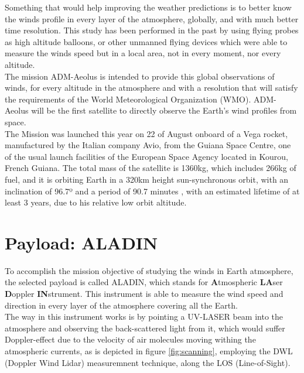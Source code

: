 Something that would help improving the weather predictions is to better know
the winds profile in every layer of the atmosphere, globally, and with much better
time resolution. This study has been performed in the past by using flying probes
as high altitude balloons, or other unmanned flying devices which were able to
measure the winds speed but in a local area, not in every moment, nor every altitude.\\

The mission ADM-Aeolus is intended to provide this global observations of winds,
for every altitude in the atmosphere and with a resolution that will satisfy the
requirements of the World Meteorological Organization (WMO). ADM-Aeolus will
be the first satellite to directly observe the Earth’s wind profiles from space.
\cite{Endemann2004}\\

The Mission was launched this year on 22 of August onboard of a Vega rocket, manufactured
by the Italian company Avio, from the Guiana Space Centre, one of the usual launch
facilities of the European Space Agency located in Kourou, French Guiana. The total
mass of the satellite is 1360kg, which includes 266kg of fuel, and it is orbiting
Earth in a 320km height sun-synchronous orbit, with an inclination of 96.7º and a period
of 90.7 minutes \cite{aeolus_n2yo.com}, with an estimated lifetime of at least
3 years, due to his relative low orbit altitude.

\section{Payload: ALADIN}

To accomplish the mission objective of studying the winds in Earth atmosphere, the
selected payload is called ALADIN, which stands for \textbf{A}tmospheric \textbf{LA}ser
\textbf{D}oppler \textbf{IN}strument. This instrument is able to measure the
wind speed and direction in every layer of the atmosphere covering all the Earth.\\

The way in this instrument works is by pointing a UV-LASER beam into the atmosphere
and observing the back-scattered light from it, which would suffer Doppler-effect
due to the velocity of air molecules moving withing the atmospheric currents, as
is depicted in figure \ref{fig:scanning}, employing the DWL (Doppler Wind Lidar) measuremnent
technique, along the LOS (Line-of-Sight).\\

